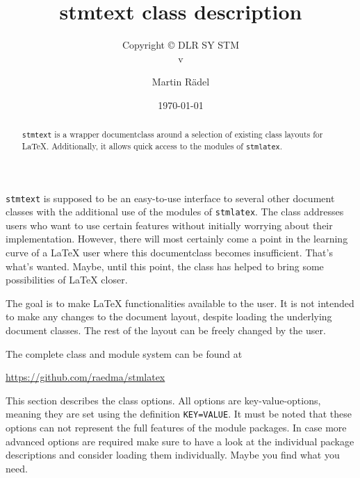 \documentclass[%
  type=article,%
  layout=koma,%
  page=false,%
  cleveref=true,%
  conditionallox=true,%
  conditionalloxnewpage=true,%
  date=true,%
  glossaries=true,%
  hyperref=true,%
  index=true,%
  listings=true%
]{stmtext}
\author{Martin R\"{a}del}
\title{stmtext class description}
\subtitle{Copyright \copyright{} \the\year{} DLR SY STM\\v\formatdate[versiondatestyle]{\DTMToday}}
\date{\today}
\begin{document}
\maketitle

\begin{abstract}
\texttt{stmtext} is a wrapper documentclass around a selection of existing class layouts for \LaTeX. Additionally, it allows quick access to the modules of \texttt{stmlatex}.
\end{abstract}

\secondpage

\tableofcontents

\conditionallistoffigures  %
\conditionallistoftables   %
\conditionallistoflistings %

\setcounter{currentlevel}{\basetoclevelnr}
\label{sec:about}

\texttt{stmtext} is supposed to be an easy-to-use interface to several other document classes with the additional use of the modules of \texttt{stmlatex}. The class addresses users who want to use certain features without initially worrying about their implementation. However, there will most certainly come a point in the learning curve of a \LaTeX{} user where this documentclass becomes insufficient. That's what's wanted. Maybe, until this point, the class has helped to bring some possibilities of \LaTeX{} closer. 

The goal is to make \LaTeX{} functionalities available to the user. It is not intended to make any changes to the document layout, despite loading the underlying document classes. The rest of the layout can be freely changed by the user.

The complete class and module system can be found at

\href{https://github.com/raedma/stmlatex}{https://github.com/raedma/stmlatex}


\setcounter{currentlevel}{\basetoclevelnr}
\label{sec:options}

This section describes the class options. All options are key-value-options, meaning they are set using the definition \texttt{KEY=VALUE}. It must be noted that these options can not represent the full features of the module packages. In case more advanced options are required make sure to have a look at the individual package descriptions and consider loading them individually. Maybe you find what you need.
\end{document}

